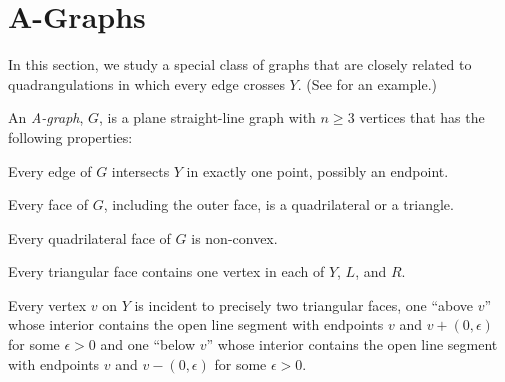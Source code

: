 \section{A-Graphs}

In this section, we study a special class of graphs that are closely
related to quadrangulations in which every edge crosses $Y$. (See  for an example.)

\begin{defn}
	An \emph{A-graph}, $G$, is a plane straight-line graph with $n\ge 3$ vertices that has the following properties:
	\begin{compactenum}
		\item Every edge of $G$ intersects $Y$ in exactly one point, possibly an endpoint.
		\item Every face of $G$, including the outer face, is a quadrilateral or a triangle.
		\item Every quadrilateral face of $G$ is non-convex.
		\item Every triangular face contains one vertex in each of $Y$, $L$,
		and $R$.  
		\item Every vertex $v$ on $Y$ is incident to precisely
		two triangular faces, one ``above $v$'' whose interior contains the open line segment with endpoints $v$ and $v+(0,\epsilon)$ for some $\epsilon>0$ and one ``below $v$'' whose interior contains the open line segment with endpoints $v$ and $v-(0,\epsilon)$ for some $\epsilon >0$.
	\end{compactenum}
\end{defn}

